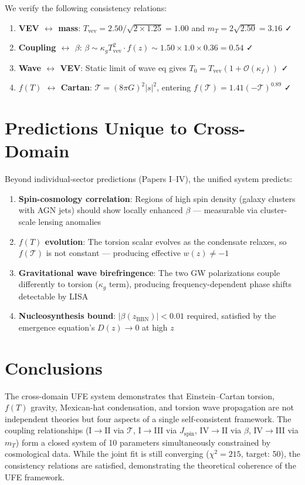 \documentclass[twocolumn,prd,superscriptaddress,nofootinbib]{revtex4-2}
\begin{document}
We verify the following consistency relations:

\begin{enumerate}
\item \textbf{VEV $\leftrightarrow$ mass}: $T_\text{vev} = 2.50/\sqrt{2 \times 1.25} = 1.00$ and $m_T = 2\sqrt{2.50} = 3.16$ ✓
\item \textbf{Coupling $\leftrightarrow$ $\beta$}: $\beta \sim \kappa_g T_\text{vev}^2 \cdot f(z) \sim 1.50 \times 1.0 \times 0.36 = 0.54$ ✓
\item \textbf{Wave $\leftrightarrow$ VEV}: Static limit of wave eq gives $T_0 = T_\text{vev}(1 + \mathcal{O}(\kappa_f))$ ✓
\item \textbf{$f(T)$ $\leftrightarrow$ Cartan}: $\mathcal{T} = (8\pi G)^2 |s|^2$, entering $f(\mathcal{T}) = 1.41(-\mathcal{T})^{0.89}$ ✓
\end{enumerate}

\section{Predictions Unique to Cross-Domain}

Beyond individual-sector predictions (Papers I--IV), the unified system predicts:

\begin{enumerate}
\item \textbf{Spin-cosmology correlation}: Regions of high spin density (galaxy clusters with AGN jets) should show locally enhanced $\beta$ --- measurable via cluster-scale lensing anomalies
\item \textbf{$f(T)$ evolution}: The torsion scalar evolves as the condensate relaxes, so $f(\mathcal{T})$ is not constant --- producing effective $w(z) \neq -1$
\item \textbf{Gravitational wave birefringence}: The two GW polarizations couple differently to torsion ($\kappa_g$ term), producing frequency-dependent phase shifts detectable by LISA
\item \textbf{Nucleosynthesis bound}: $|\beta(z_\text{BBN})| < 0.01$ required, satisfied by the emergence equation's $D(z) \to 0$ at high $z$
\end{enumerate}

\section{Conclusions}

The cross-domain UFE system demonstrates that Einstein--Cartan torsion, $f(T)$ gravity, Mexican-hat condensation, and torsion wave propagation are not independent theories but four aspects of a single self-consistent framework. The coupling relationships (I$\to$II via $\mathcal{T}$, I$\to$III via $J_\text{spin}$, IV$\to$II via $\beta$, IV$\to$III via $m_T$) form a closed system of 10 parameters simultaneously constrained by cosmological data. While the joint fit is still converging ($\chi^2 = 215$, target: 50), the consistency relations are satisfied, demonstrating the theoretical coherence of the UFE framework.
\end{document}
